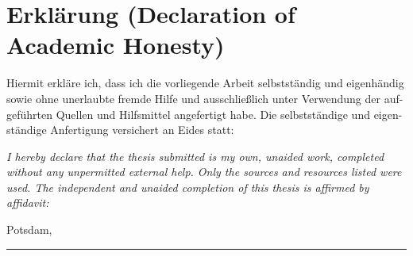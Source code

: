 \fancyhf{}
\section*{Erklärung (Declaration of Academic Honesty)}

Hiermit erkläre ich, dass ich die vorliegende Arbeit selbstständig und eigenhändig sowie ohne unerlaubte fremde Hilfe und ausschließlich unter Verwendung der auf-geführten Quellen und Hilfsmittel angefertigt habe.
Die selbstständige und eigen-ständige Anfertigung versichert an Eides statt:

\textit{I hereby declare that the thesis submitted is my own, unaided work, completed without any unpermitted external help. 
Only the sources and resources listed were used.
The independent and unaided completion of this thesis is affirmed by affidavit:}

Potsdam, \submissionDate\\[1cm]

\hrule width5cm
\name